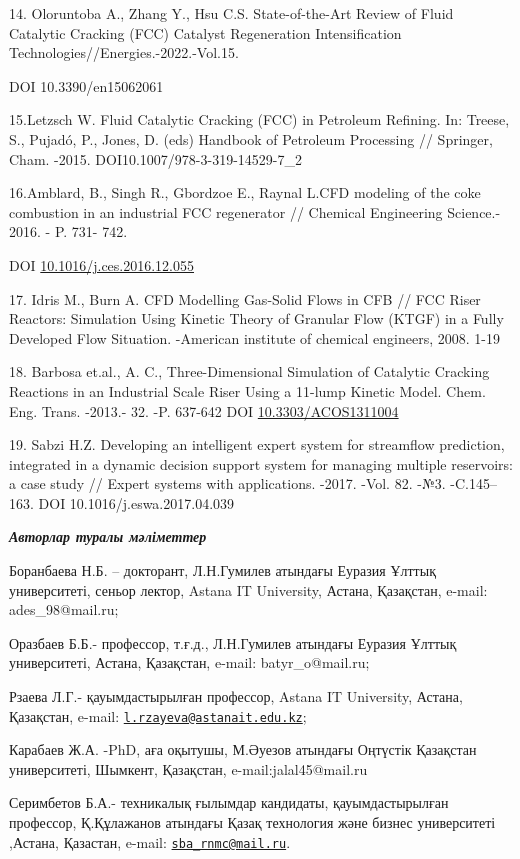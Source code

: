 14. Oloruntoba A., Zhang Y., Hsu C.S. State-of-the-Art Review of Fluid
Catalytic Cracking (FCC) Catalyst Regeneration Intensification
Technologies//Energies.-2022.-Vol.15.

DOI 10.3390/en15062061

15.Letzsch W. Fluid Catalytic Cracking (FCC) in Petroleum Refining. In:
Treese, S., Pujadó, P., Jones, D. (eds) Handbook of Petroleum Processing
// Springer, Cham. -2015. DOI10.1007/978-3-319-14529-7\_2

16.Amblard, B., Singh R., Gbordzoe E., Raynal L.CFD modeling of the coke
combustion in an industrial FCC regenerator // Chemical Engineering
Science.- 2016. - P. 731- 742.

DOI
\href{http://dx.doi.org/10.1016/j.ces.2016.12.055}{10.1016/j.ces.2016.12.055}

17. Idris M., Burn A. CFD Modelling Gas-Solid Flows in CFB // FCC Riser
Reactors: Simulation Using Kinetic Theory of Granular Flow (KTGF) in a
Fully Developed Flow Situation. -American institute of chemical
engineers, 2008. 1-19

18. Barbosa et.al., A. C., Three-Dimensional Simulation of Catalytic
Cracking Reactions in an Industrial Scale Riser Using a 11-lump Kinetic
Model. Chem. Eng. Trans. -2013.- 32. -P. 637-642 DOI
\href{http://dx.doi.org/10.3303/ACOS1311004}{10.3303/ACOS1311004}

19. Sabzi H.Z. Developing an intelligent expert system for streamflow
prediction, integrated in a dynamic decision support system for managing
multiple reservoirs: a case study // Expert systems with applications.
-2017. -Vol. 82. -№3. -C.145--163. DOI 10.1016/j.eswa.2017.04.039

\emph{{\bfseries Авторлар туралы мәліметтер}}

Боранбаева Н.Б. -- докторант, Л.Н.Гумилев атындағы Еуразия Ұлттық
университеті, сеньор лектор, Astana IT University, Астана, Қазақстан,
e-mail: ades\_98@mail.ru;

Оразбаев Б.Б.- профессор, т.ғ.д., Л.Н.Гумилев атындағы Еуразия Ұлттық
университеті, Астана, Қазақстан, e-mail: batyr\_o@mail.ru;

Рзаева Л.Г.- қауымдастырылған профессор, Astana IT University, Астана,
Қазақстан, e-mail:
\href{mailto:l.rzayeva@astanait.edu.kz}{\nolinkurl{l.rzayeva@astanait.edu.kz}};

Карабаев Ж.А. -PhD, аға оқытушы, М.Әуезов атындағы Оңтүстік Қазақстан
университеті, Шымкент, Қазақстан, e-mail:jalal45@mail.ru

Серимбетов Б.А.- техникалық ғылымдар кандидаты, қауымдастырылған
профессор, Қ.Құлажанов атындағы Қазақ технология және бизнес
университеті ,Астана, Қазастан, e-mail:
\href{mailto:sba_rnmc@mail.ru}{\nolinkurl{sba\_rnmc@mail.ru}}.

